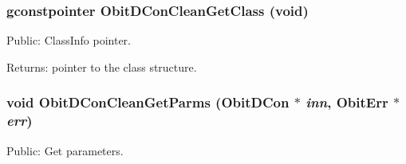 \subsubsection{\setlength{\rightskip}{0pt plus 5cm}gconstpointer Obit\-DCon\-Clean\-Get\-Class (void)}\label{ObitDConClean_8h_a15}


Public: Class\-Info pointer. 

\begin{Desc}
\item[Returns:]pointer to the class structure. \end{Desc}
\subsubsection{\setlength{\rightskip}{0pt plus 5cm}void Obit\-DCon\-Clean\-Get\-Parms ({\bf Obit\-DCon} $\ast$ {\em inn}, {\bf Obit\-Err} $\ast$ {\em err})}\label{ObitDConClean_8h_a19}


Public: Get parameters. 


